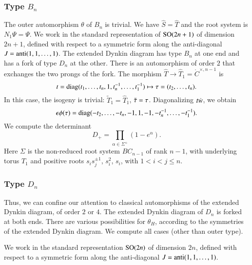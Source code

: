 \subsubsection{Type $B_n$}

The outer automorphism $\theta$ of $B_n$ is trivial.  We have $\hat S = \hat T$ and the root system is $N_1\Psi =\Psi$.
We work in the standard representation of ${\operatorname{SO}}(2n+1)$ of dimension $2n+1$, defined with respect to a symmetric form 
along the anti-diagonal $J = {\operatorname{anti}}(1,1,\ldots,1)$. 
The extended Dynkin diagram has type $B_n$ at one end and has a fork of type $D_n$ at the other.
There is  an automorphism of order $2$ that exchanges the two prongs of the fork.
The morphism $\hat T\to \hat T_1=\ring{C}^{\times,n-1}$ is 
\[
t = {\operatorname{diag}}(t_1,\ldots,t_n,1,t_n^{-1},\ldots,t_1^{-1})\mapsto \tau = (t_2,\ldots,t_n).
\]
In this case, the isogeny is trivial: $\tilde T_1= \hat T_1$, $\tilde\tau=\tau$.
Diagonalizing $t\dot w$, we obtain
\begin{equation}
\epsilon\phi(\tau) = {\operatorname{diag}}(-t_2,\ldots,-t_n,-1,1,-1,-t_n^{-1},\ldots,-t_1^{-1}).
\end{equation}
We compute the determinant
\begin{equation}
D_+ = \prod_{\alpha\in \Sigma^+} (1-e^\alpha).
\end{equation}
Here $\Sigma$ is the non-reduced root system $BC_{n-1}$ of rank $n-1$, with underlying torus $\hat T_1$
and positive roots $s_i s_j^{\pm 1}$, $s_i^2$, $s_i$, with $1<i<j\le n$.


\subsubsection{Type $D_n$}\label{sec:dn}

Thus, we can confine our attention to classical automorphisms of the
extended Dynkin diagram, of order $2$ or $4$.  The extended Dynkin diagram of $D_n$ is forked at both ends.
There are various possibilities for $\theta_H$,
according to the symmetries of the extended Dynkin diagram.  We compute all cases (other than outer type).

We work in the standard representation ${\operatorname{SO}}(2n)$
of dimension $2n$, defined with respect to a symmetric form 
along the anti-diagonal $J = {\operatorname{anti}}(1,1,\ldots,1)$. 

